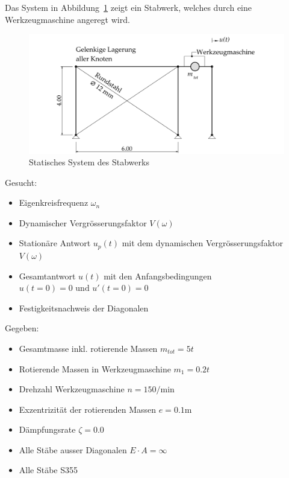 \documentclass[
  letterpaper,
  DIV=11]{scrreprt}
\providecommand{\tightlist}{%
  \setlength{\itemsep}{0pt}\setlength{\parskip}{0pt}}\usepackage{longtable,booktabs,array}
\begin{document}
Das System in Abbildung~\ref{fig-ems_ges_system_maschine} zeigt ein
Stabwerk, welches durch eine Werkzeugmaschine angeregt wird.

\begin{figure}[H]

{\centering \includegraphics{index_files/mediabag/bilder/aufgabe_ems_ges_system.pdf}

}

\caption{\label{fig-ems_ges_system_maschine}Statisches System des
Stabwerks}

\end{figure}

Gesucht:

\begin{itemize}
\tightlist
\item
  Eigenkreisfrequenz \(\omega_n\)
\item
  Dynamischer Vergrösserungsfaktor \(V(\omega)\)
\item
  Stationäre Antwort \(u_p(t)\) mit dem dynamischen Vergrösserungsfaktor
  \(V(\omega)\)
\item
  Gesamtantwort \(u(t)\) mit den Anfangsbedingungen
  \(u(t=0) = 0 \text{ und } u'(t=0)=0\)
\item
  Festigkeitsnachweis der Diagonalen
\end{itemize}

Gegeben:

\begin{itemize}
\tightlist
\item
  Gesamtmasse inkl. rotierende Massen \(m_{tot} = 5t\)
\item
  Rotierende Massen in Werkzeugmaschine \(m_1 = 0.2 t\)
\item
  Drehzahl Werkzeugmaschine \(n = 150/\text{min}\)
\item
  Exzentrizität der rotierenden Massen \(e =0.1\text{m}\)
\item
  Dämpfungsrate \(\zeta = 0.0\)
\item
  Alle Stäbe ausser Diagonalen \(E\cdot A = \infty\)
\item
  Alle Stäbe S355
\end{itemize}
\end{document}
